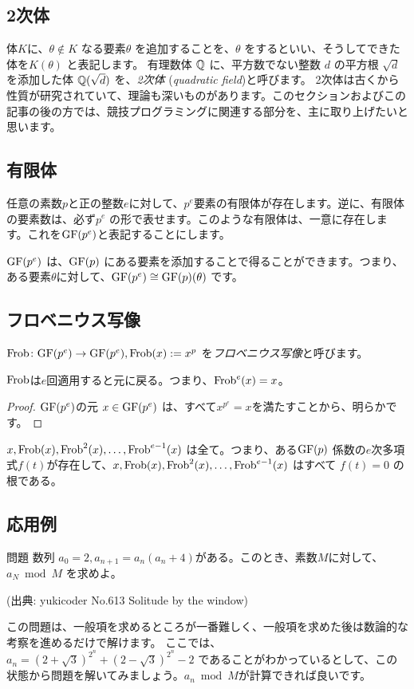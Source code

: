 \documentclass{jsarticle}
\begin{document}
  \subsection{2次体}
  \label{subsec:quadratic-field}
  体$K$に、$\theta \not \in K$ なる要素$\theta$ を追加することを、$\theta$ をするといい、そうしてできた体を$K(\theta)$ と表記します。
  有理数体 $\mathbb{Q}$ に、平方数でない整数 $d$ の平方根 $\sqrt{d}$を添加した体 $\mathbb{Q}(\sqrt{d})$ を、\emph{2次体} (\emph{quadratic field})と呼びます。
  2次体は古くから性質が研究されていて、理論も深いものがあります。このセクションおよびこの記事の後の方では、競技プログラミングに関連する部分を、主に取り上げたいと思います。
  \subsection{有限体}
  任意の素数$p$と正の整数$e$に対して、$p^e$要素の有限体が存在します。逆に、有限体の要素数は、必ず$p^e$ の形で表せます。このような有限体は、一意に存在します。これを$\mathrm{GF}(p^e)$と表記することにします。

  $\mathrm{GF}(p^e)$ は、$\mathrm{GF}(p)$ にある要素を添加することで得ることができます。つまり、ある要素$\theta$に対して、$\mathrm{GF}(p^e) \cong \mathrm{GF}(p)(\theta)$ です。
  \subsection{フロベニウス写像}
  $\mathrm{Frob} \colon \mathrm{GF}(p^e) \to \mathrm{GF}(p^e), \mathrm{Frob}(x) := x^p$ を\emph{フロベニウス写像}と呼びます。
  \begin{proposition}
   $\mathrm{Frob}$は$e$回適用すると元に戻る。つまり、$\mathrm{Frob}^e(x) = x$。
  \end{proposition}
  \begin{proof}
   $\mathrm{GF}(p^e)$の元 $x\in \mathrm{GF}(p^e)$ は、すべて$x^{p^e}=x$を満たすことから、明らかです。
  \end{proof}
  \begin{proposition}
   $x, \mathrm{Frob}(x), \mathrm{Frob}^2(x), \ldots, \mathrm{Frob}^{e-1}(x)$ は全て。つまり、ある$\mathrm{GF}(p)$ 係数の$e$次多項式$f(t)$が存在して、$x, \mathrm{Frob}(x), \mathrm{Frob}^2(x), \ldots, \mathrm{Frob}^{e-1}(x)$ はすべて $f(t)=0$ の根である。
  \end{proposition}
  \subsection{応用例}
  \label{subsec:application-of-frobenius}
  \begin{itembox}[l]{問題}
   数列 $a_0 = 2, a_{n+1} = a_n(a_n+4)$がある。このとき、素数$M$に対して、$a_N \bmod M$ を求めよ。

   (出典: yukicoder No.613 Solitude by the window)
  \end{itembox}
  この問題は、一般項を求めるところが一番難しく、一般項を求めた後は数論的な考察を進めるだけで解けます。
  ここでは、$a_n = (2+\sqrt{3})^{2^n} + (2-\sqrt{3})^{2^n} - 2$ であることがわかっているとして、この状態から問題を解いてみましょう。$a_n \bmod M$が計算できれば良いです。
\end{document}
